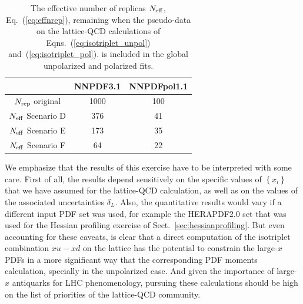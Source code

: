 \begin{table}[h!]
  \centering
  \renewcommand{\arraystretch}{1.3} 
  \begin{tabular}{c|c|c}
    \hline
    &  NNPDF3.1  &  NNPDFpol1.1 \\
    \hline
    \hline
    $N_{\rm rep}$ original   &   1000 &  100   \\
    \hline
     $N_{\rm eff}$ Scenario D    &   376  &  41   \\
     $N_{\rm eff}$ Scenario E    &   173   &   35  \\
     $N_{\rm eff}$ Scenario F   &   64  &   22  \\
    \hline
  \end{tabular}
  \caption{\small The effective number of replicas
    $N_{\rm eff}$, Eq.~(\ref{eq:effnrep}), remaining when the pseudo-data
    on the lattice-QCD calculations
    of Eqns.~(\ref{eq:isotriplet_unpol})
and~(\ref{eq:isotriplet_pol}).
   is included in the global
    unpolarized and polarized fits. 
    \label{tab:neffxspace}
  }
\end{table}

We emphasize that
the results of this exercise have to be interpreted
with some care.
%
First of all, the results depend sensitively on the specific values of
$\left\{ x_i \right\}$
that we have assumed for the lattice-QCD calculation,
as well as on the values
of the associated uncertainties $\delta_L$.
%
Also, the quantitative results would vary if a different input PDF set
was used, for example the HERAPDF2.0 set that was used for
the Hessian profiling exercise of Sect.~\ref{sec:hessianprofiling}.
%
But even accounting for these caveats, is clear that a direct
computation of the isotriplet combination $x u-x d$ on the lattice
has the potential to constrain the large-$x$ PDFs in
a more significant way that the corresponding PDF moments calculation,
specially in the unpolarized case.
%
And given the importance of large-$x$ antiquarks for LHC phenomenology,
pursuing these calculations should be high on the list
of priorities of the lattice-QCD community.


